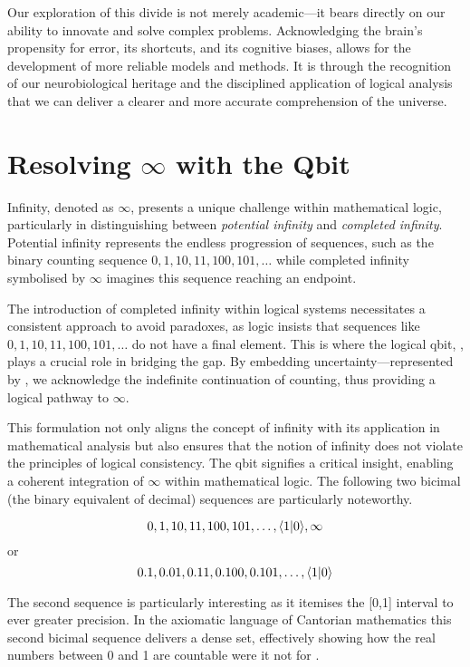 \documentclass[12pt]{article}
\begin{document}
Our exploration of this divide is not merely academic—it bears directly on our ability to innovate and solve complex problems. Acknowledging the brain's propensity for error, its shortcuts, and its cognitive biases, allows for the development of more reliable models and methods. It is through the recognition of our neurobiological heritage and the disciplined application of logical analysis that we can deliver a clearer and more accurate comprehension of the universe.

\section*{Resolving $\infty$ with the Qbit \qbit{}}

Infinity, denoted as $\infty$, presents a unique challenge within mathematical logic, particularly in distinguishing between \textit{potential infinity} and \textit{completed infinity}. Potential infinity represents the endless progression of sequences, such as the binary counting sequence $0, 1, 10, 11, 100, 101, \ldots$ while completed infinity symbolised by $\infty$ imagines this sequence reaching an endpoint.

The introduction of completed infinity within logical systems necessitates a consistent approach to avoid paradoxes, as logic insists that sequences like $0, 1, 10, 11, 100, 101, \ldots$ do not have a final element. This is where the logical qbit, \qbit{}, plays a crucial role in bridging the gap. By embedding uncertainty—represented by \qbit{}, we acknowledge the indefinite continuation of counting, thus providing a logical pathway to $\infty$.

This formulation not only aligns the concept of infinity with its application in mathematical analysis but also ensures that the notion of infinity does not violate the principles of logical consistency. The qbit signifies a critical insight, enabling a coherent integration of $\infty$ within mathematical logic. The following two bicimal (the binary equivalent of decimal) sequences are particularly noteworthy.

\begin{equation}
    0, 1, 10, 11, 100, 101, \ldots, \langle 1 | 0 \rangle{}, \infty
\end{equation}
or
\begin{equation}
    0.1, 0.01, 0.11, 0.100, 0.101, \ldots, \langle 1 | 0 \rangle{}
\end{equation}

The second sequence is particularly interesting as it itemises the [0,1] interval to ever greater precision. In the axiomatic language of Cantorian mathematics this second bicimal sequence delivers a dense set, effectively showing how the real numbers between 0 and 1 are countable were it not for \qbit{}.
\end{document}
